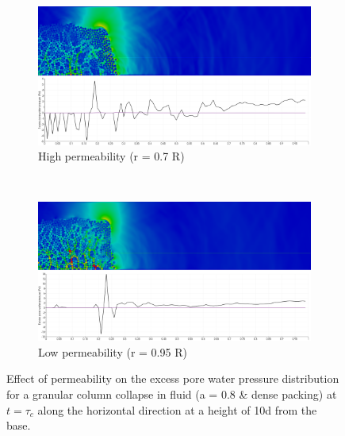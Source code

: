 \begin{figure}
\centering
\begin{subfigure}[t]{0.975\textwidth}
	\centering
    \includegraphics[width=\textwidth]{a08/r07_PWP_ini_dense}
    \caption{High permeability (r = 0.7 R)}
    \label{fig:r07_PWP_ini_dense}
\end{subfigure} \\
\begin{subfigure}[t]{0.975\textwidth}
	\centering
    \includegraphics[width=\textwidth]{a08/r095_PWP_ini_dense}
    \caption{Low permeability (r = 0.95 R)}
    \label{fig:r095_PWP_ini_dense}
\end{subfigure}
\caption{Effect of permeability on the excess pore water pressure distribution 
for a granular column collapse in fluid (a = 0.8 \& dense packing) at $t = 
\tau_c$ along the horizontal direction at a height of 10d from the base.}
\label{fig:PWP_ini_dense}
\end{figure}

